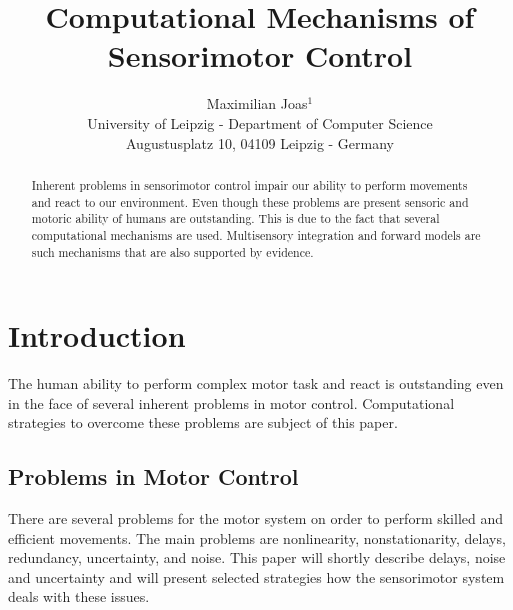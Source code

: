 \documentclass{SeminarV2}
\begin{document}
\title{Computational Mechanisms of Sensorimotor Control}

\author{Maximilian Joas$^1$ 
%
%
\vspace{.3cm}\\
%
University of Leipzig  - Department of Computer Science \\
Augustusplatz 10, 04109 Leipzig  - Germany\\}

%


\maketitle

\begin{abstract}
	Inherent problems in sensorimotor control impair our ability to perform movements and react to our environment. Even though these problems are present sensoric and motoric ability of humans are outstanding. This is due to the fact that several computational mechanisms are used. Multisensory integration and forward models are such mechanisms that are also supported by evidence.

\end{abstract}

\section{Introduction}

The human ability to perform complex motor task and react is outstanding even in the face of several inherent problems in motor control. Computational strategies to overcome these problems are subject of this paper.
\subsection{Problems in Motor Control}
There are several problems for the motor system on order to perform skilled and efficient movements. The main problems are nonlinearity, nonstationarity, delays, redundancy, uncertainty,
and noise\cite{franklin2011computational}. This paper will shortly describe delays, noise and uncertainty and will present selected strategies how the sensorimotor system deals with these issues.
\end{document}
